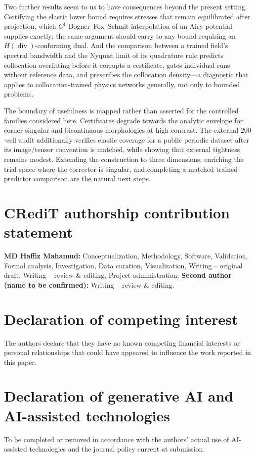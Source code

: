 \documentclass[preprint,12pt]{elsarticle}
\begin{document}
Two further results seem to us to have consequences beyond the present
setting. Certifying the elastic lower bound requires stresses that remain
equilibrated after projection, which $C^1$ Bogner--Fox--Schmit
interpolation of an Airy potential supplies exactly; the same argument
should carry to any bound requiring an $H(\operatorname{div})$-conforming
dual. And the comparison between a trained field's spectral bandwidth and
the Nyquist limit of its quadrature rule predicts collocation overfitting
before it corrupts a certificate, gates individual runs without reference
data, and prescribes the collocation density---a diagnostic that applies to
collocation-trained physics networks generally, not only to bounded
problems.

The boundary of usefulness is mapped rather than asserted for the controlled
families considered here. Certificates degrade towards the analytic envelope
for corner-singular and bicontinuous morphologies at high contrast. The
external $200$-cell audit additionally verifies elastic coverage for a public
periodic dataset after its image/tensor convention is matched, while showing
that external tightness remains modest. Extending the construction to three
dimensions, enriching the trial space where the corrector is singular, and
completing a matched trained-predictor comparison are the natural next steps.

\section*{CRediT authorship contribution statement}
\textbf{MD Haffiz Mahamud:} Conceptualization, Methodology, Software,
Validation, Formal analysis, Investigation, Data curation, Visualization,
Writing -- original draft, Writing -- review \& editing, Project
administration. \textbf{Second author (name to be confirmed):} Writing --
review \& editing.

\section*{Declaration of competing interest}
The authors declare that they have no known competing financial interests
or personal relationships that could have appeared to influence the work
reported in this paper.

\section*{Declaration of generative AI and AI-assisted technologies}
To be completed or removed in accordance with the authors' actual use of
AI-assisted technologies and the journal policy current at submission.
\end{document}
